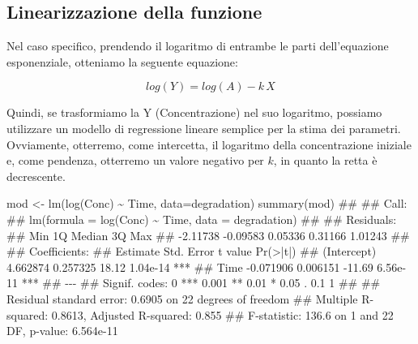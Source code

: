 \documentclass[a4paper,12pt,oneside]{book}
\newenvironment{Shaded}{\begin{snugshade}}{\end{snugshade}}
\newcommand{\SpecialCharTok}[1]{#1}
\newcommand{\DocumentationTok}[1]{#1}
\newcommand{\OtherTok}[1]{#1}
\newcommand{\FunctionTok}[1]{#1}
\newcommand{\AttributeTok}[1]{#1}
\newcommand{\NormalTok}[1]{#1}
\begin{document}
\hypertarget{linearizzazione-della-funzione}{%
\subsection{Linearizzazione della funzione}\label{linearizzazione-della-funzione}}

Nel caso specifico, prendendo il logaritmo di entrambe le parti dell'equazione esponenziale, otteniamo la seguente equazione:

\[ log(Y) = log(A) - k \, X \]

Quindi, se trasformiamo la Y (Concentrazione) nel suo logaritmo, possiamo utilizzare un modello di regressione lineare semplice per la stima dei parametri. Ovviamente, otterremo, come intercetta, il logaritmo della concentrazione iniziale e, come pendenza, otterremo un valore negativo per \(k\), in quanto la retta è decrescente.

\begin{Shaded}
\begin{Highlighting}[]
\NormalTok{mod }\OtherTok{\textless{}{-}} \FunctionTok{lm}\NormalTok{(}\FunctionTok{log}\NormalTok{(Conc) }\SpecialCharTok{\textasciitilde{}}\NormalTok{ Time, }\AttributeTok{data=}\NormalTok{degradation)}
\FunctionTok{summary}\NormalTok{(mod)}
\DocumentationTok{\#\# }
\DocumentationTok{\#\# Call:}
\DocumentationTok{\#\# lm(formula = log(Conc) \textasciitilde{} Time, data = degradation)}
\DocumentationTok{\#\# }
\DocumentationTok{\#\# Residuals:}
\DocumentationTok{\#\#      Min       1Q   Median       3Q      Max }
\DocumentationTok{\#\# {-}2.11738 {-}0.09583  0.05336  0.31166  1.01243 }
\DocumentationTok{\#\# }
\DocumentationTok{\#\# Coefficients:}
\DocumentationTok{\#\#              Estimate Std. Error t value Pr(\textgreater{}|t|)    }
\DocumentationTok{\#\# (Intercept)  4.662874   0.257325   18.12 1.04e{-}14 ***}
\DocumentationTok{\#\# Time        {-}0.071906   0.006151  {-}11.69 6.56e{-}11 ***}
\DocumentationTok{\#\# {-}{-}{-}}
\DocumentationTok{\#\# Signif. codes:  0 \textquotesingle{}***\textquotesingle{} 0.001 \textquotesingle{}**\textquotesingle{} 0.01 \textquotesingle{}*\textquotesingle{} 0.05 \textquotesingle{}.\textquotesingle{} 0.1 \textquotesingle{} \textquotesingle{} 1}
\DocumentationTok{\#\# }
\DocumentationTok{\#\# Residual standard error: 0.6905 on 22 degrees of freedom}
\DocumentationTok{\#\# Multiple R{-}squared:  0.8613, Adjusted R{-}squared:  0.855 }
\DocumentationTok{\#\# F{-}statistic: 136.6 on 1 and 22 DF,  p{-}value: 6.564e{-}11}
\end{Highlighting}
\end{Shaded}
\end{document}

